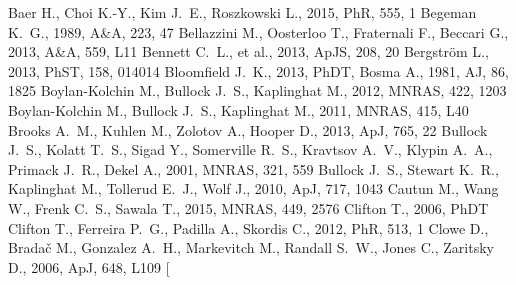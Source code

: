\documentclass[a4wide,12pt]{book}
\begin{document}
\begin{thebibliography}{}
Baer H., Choi K.-Y., Kim J.~E., Roszkowski L., 2015, PhR, 555, 1 
 Begeman K.~G., 1989, A\&A, 223, 47 
 Bellazzini M., Oosterloo T., Fraternali F., Beccari G., 2013, A\&A, 559, L11 
 Bennett C.~L., et al., 2013, ApJS, 208, 20 
Bergstr{\"o}m L., 2013, PhST, 158, 014014
Bloomfield J.~K., 2013, PhDT, 
 Bosma 
A., 1981, AJ, 86, 1825 
 Boylan-Kolchin M., Bullock J.~S., Kaplinghat M., 2012, MNRAS, 422, 1203 
 Boylan-Kolchin M., Bullock J.~S., Kaplinghat M., 2011, MNRAS, 415, L40 
Brooks A.~M., Kuhlen M., Zolotov A., Hooper D., 2013, ApJ, 765, 22 
 Bullock J.~S., Kolatt T.~S., Sigad Y., 
Somerville R.~S., Kravtsov A.~V., Klypin A.~A., Primack J.~R., Dekel A., 
2001, MNRAS, 321, 559 
 Bullock J.~S., Stewart K.~R., Kaplinghat 
M., Tollerud E.~J., Wolf J., 2010, ApJ, 717, 1043 
Cautun M., Wang W., Frenk C.~S., Sawala T., 2015, MNRAS, 449, 2576
Clifton T., 2006, PhDT
 Clifton T., Ferreira P.~G., Padilla A., 
Skordis C., 2012, PhR, 513, 1  
Clowe D., Brada{\v c} M., Gonzalez A.~H., Markevitch M., Randall S.~W., 
Jones C., Zaritsky D., 2006, ApJ, 648, L109
\bibitem[\protect{}
\end{thebibliography}
\end{document}
